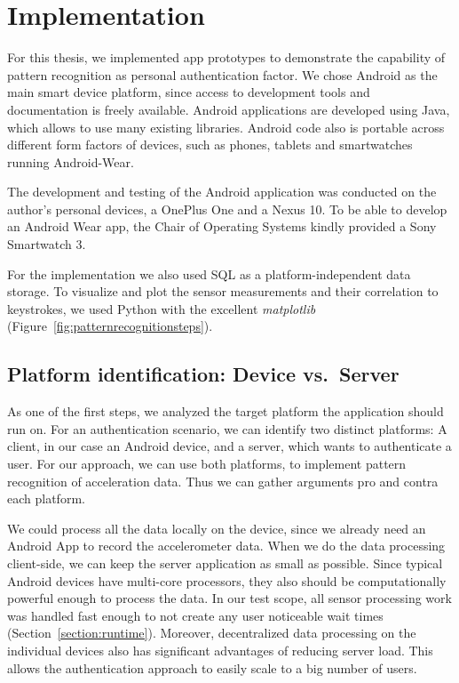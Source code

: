 \chapter{Implementation}\label{chapter:implementation}
For this thesis, we implemented app prototypes to demonstrate the capability of pattern recognition as personal authentication factor. We chose Android as the main smart device platform, since access to development tools and documentation is freely available. Android applications are developed using Java, which allows to use many existing libraries. Android code also is portable across different form factors of devices, such as phones, tablets and smartwatches running Android-Wear.

The development and testing of the Android application was conducted on the author's personal devices, a OnePlus One and a Nexus 10. To be able to develop an Android Wear app, the Chair of Operating Systems kindly provided a Sony Smartwatch 3.

For the implementation we also used SQL as a platform-independent data storage. To visualize and plot the sensor measurements and their correlation to keystrokes, we used Python with the excellent \emph{matplotlib} (\cf Figure~\ref{fig:patternrecognitionsteps}).

\section{Platform identification: Device vs.\ Server}
As one of the first steps, we analyzed the target platform the application should run on. For an authentication scenario, we can identify two distinct platforms: A client, in our case an Android device, and a server, which wants to authenticate a user. For our approach, we can use both platforms, to implement pattern recognition of acceleration data. Thus we can gather arguments pro and contra each platform.

We could process all the data locally on the device, since we already need an Android App to record the accelerometer data. When we do the data processing client-side, we can keep the server application as small as possible. Since typical Android devices have multi-core processors, they also should be computationally powerful enough to process the data. In our test scope, all sensor processing work was handled fast enough to not create any user noticeable wait times (\cf Section~\ref{section:runtime}). Moreover, decentralized data processing on the individual devices also has significant advantages of reducing server load. This allows the authentication approach to easily scale to a big number of users.

